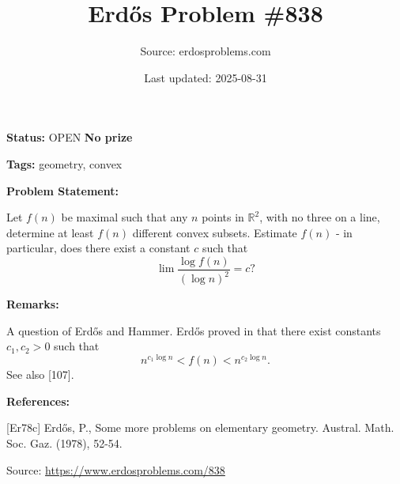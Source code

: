 \documentclass{article}
\title{Erd\H{o}s Problem \#838}
\date{Last updated: 2025-08-31}
\author{Source: erdosproblems.com}
\begin{document}
\maketitle

\noindent\textbf{Status:} OPEN \quad \textbf{No prize}

\noindent\textbf{Tags:} geometry, convex

\medskip
\noindent\textbf{Problem Statement:}

Let $f(n)$ be maximal such that any $n$ points in $\mathbb{R}^2$, with no three on a line, determine at least $f(n)$ different convex subsets. Estimate $f(n)$ - in particular, does there exist a constant $c$ such that\[\lim \frac{\log f(n)}{(\log n)^2}=c?\]

\bigskip
\noindent\textbf{Remarks:}

A question of Erd\H{o}s and Hammer. Erd\H{o}s proved in \cite{Er78c} that there exist constants $c_1,c_2>0$ such that\[n^{c_1\log n}<f(n)< n^{c_2\log n}.\]See also [107].

\bigskip
\noindent\textbf{References:}

[Er78c] Erd\H{o}s, P., Some more problems on elementary geometry. Austral. Math. Soc. Gaz. (1978), 52-54.

\bigskip
\noindent\small{Source: \url{https://www.erdosproblems.com/838}}
\end{document}
